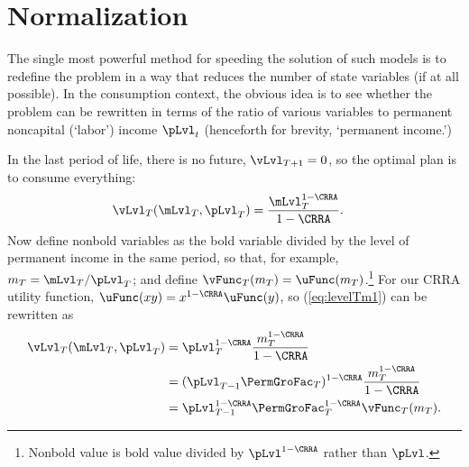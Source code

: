 \hypertarget{normalization}{}
\section{Normalization}\label{sec:normalization}

The single most powerful method for speeding the solution of such models is to redefine the problem in a way that reduces the number of state variables (if at all possible).  In the consumption context, the obvious idea is to see whether the problem can be rewritten in terms of the ratio of various variables to permanent noncapital (`labor') income $\pLvl_{t}$ (henceforth for brevity, `permanent income.')

In the last {period} of life, there is no future, ${\vLvl}_{T+1} = 0$, so the optimal plan is to consume everything:
\begin{equation}\begin{gathered}\begin{aligned}
      {\vLvl}_{T}(\mLvl_{T},\pLvl_{T})  & = \frac{\mLvl_{T}^{1-\CRRA}}{1-\CRRA}. \label{eq:levelTm1}
    \end{aligned}\end{gathered}\end{equation}
Now define nonbold variables as the bold variable divided by the level of permanent income in the same period, so that, for example, ${m}_{T}=\mLvl_{T}/\pLvl_{T}$; and define $\vFunc_{T}({m}_{T}) = \uFunc({m}_{T})$.\footnote{Nonbold value is bold value divided by $\pLvl^{1-\CRRA}$ rather than $\pLvl$.}  For our CRRA utility function, $\uFunc(xy)=x^{1-\CRRA}\uFunc(y)$, so (\ref{eq:levelTm1}) can be rewritten as
\begin{equation}\begin{gathered}\begin{aligned}
      {\vLvl}_{T}(\mLvl_{T},\pLvl_{T}) & = \pLvl_{T}^{1-\CRRA}\frac{{m}_{T}^{1-\CRRA}}{1-\CRRA}                       \\
                                                & = (\pLvl_{T-1}\PermGroFac_{T})^{1-\CRRA}\frac{{m}_{T}^{1-\CRRA}}{1-\CRRA} \\
                                                &= \pLvl_{T-1}^{1-\CRRA}\PermGroFac_{T}^{1-\CRRA}\vFunc_{T}({m}_{T}). \label{eq:vT}
    \end{aligned}\end{gathered}\end{equation}

